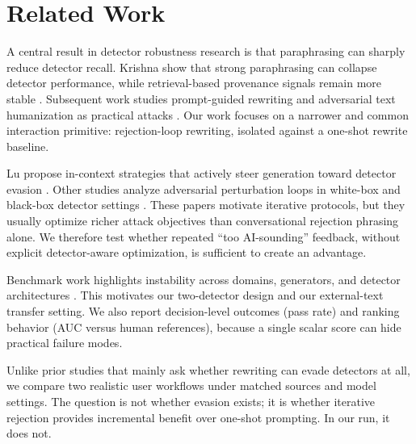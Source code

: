 \section{Related Work}
\label{sec:related_work}

 A central result in detector robustness research is that paraphrasing can sharply reduce detector recall. Krishna \etal show that strong paraphrasing can collapse detector performance, while retrieval-based provenance signals remain more stable \cite{krishna2023paraphrasing}. Subsequent work studies prompt-guided rewriting and adversarial text humanization as practical attacks \cite{lu2024guided,zhou2024humanizing}. Our work focuses on a narrower and common interaction primitive: rejection-loop rewriting, isolated against a one-shot rewrite baseline.

 Lu \etal propose in-context strategies that actively steer generation toward detector evasion \cite{lu2024guided}. Other studies analyze adversarial perturbation loops in white-box and black-box detector settings \cite{zhou2024humanizing}. These papers motivate iterative protocols, but they usually optimize richer attack objectives than conversational rejection phrasing alone. We therefore test whether repeated ``too AI-sounding'' feedback, without explicit detector-aware optimization, is sufficient to create an advantage.

 Benchmark work highlights instability across domains, generators, and detector architectures \cite{mitchell2023detect,si2023possibilities,hu2024robust}. This motivates our two-detector design and our external-text transfer setting. We also report decision-level outcomes (pass rate) and ranking behavior (AUC versus human references), because a single scalar score can hide practical failure modes.

 Unlike prior studies that mainly ask whether rewriting can evade detectors at all, we compare two realistic user workflows under matched sources and model settings. The question is not whether evasion exists; it is whether iterative rejection provides incremental benefit over one-shot prompting. In our run, it does not.

